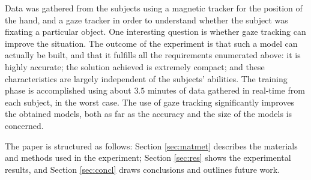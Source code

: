 Data was gathered from the subjects using a magnetic tracker for the
position of the hand, and a gaze tracker in order to understand
whether the subject was fixating a particular object. One interesting
question is whether gaze tracking can improve the situation. The
outcome of the experiment is that such a model can actually be built,
and that it fulfills all the requirements enumerated above: it is
highly accurate; the solution achieved is extremely compact; and these
characteristics are largely independent of the subjects'
abilities. The training phase is accomplished using about $3.5$
minutes of data gathered in real-time from each subject, in the worst
case. The use of gaze tracking significantly improves the obtained
models, both as far as the accuracy and the size of the models is
concerned.

The paper is structured as follows: Section \ref{sec:matmet} describes
the materials and methods used in the experiment; Section
\ref{sec:res} shows the experimental results, and Section
\ref{sec:concl} draws conclusions and outlines future work.
